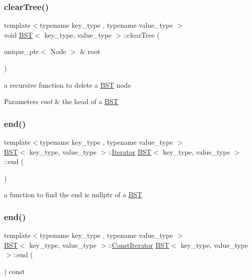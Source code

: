 \subsubsection{\texorpdfstring{clearTree()}{clearTree()}}
{\footnotesize\ttfamily template$<$typename key\+\_\+type , typename value\+\_\+type $>$ \\
void \mbox{\hyperlink{class_b_s_t}{B\+ST}}$<$ key\+\_\+type, value\+\_\+type $>$\+::clear\+Tree (\begin{DoxyParamCaption}\item[{unique\+\_\+ptr$<$ Node $>$ \&}]{root }\end{DoxyParamCaption})}

a recursive function to delete a \mbox{\hyperlink{class_b_s_t}{B\+ST}} node 
\begin{DoxyParams}{Parameters}
{\em root} & the head of a \mbox{\hyperlink{class_b_s_t}{B\+ST}} \\
\hline
\end{DoxyParams}
\mbox{\label{class_b_s_t_a758f78a965cb2816f0502ff78b2fb542}} 
\subsubsection{\texorpdfstring{end()}{end()}\hspace{0.1cm}{\footnotesize\ttfamily [1/2]}}
{\footnotesize\ttfamily template$<$typename key\+\_\+type , typename value\+\_\+type $>$ \\
\mbox{\hyperlink{class_b_s_t}{B\+ST}}$<$ key\+\_\+type, value\+\_\+type $>$\+::\mbox{\hyperlink{class_b_s_t_1_1_iterator}{Iterator}} \mbox{\hyperlink{class_b_s_t}{B\+ST}}$<$ key\+\_\+type, value\+\_\+type $>$\+::end (\begin{DoxyParamCaption}{ }\end{DoxyParamCaption})}

a function to find the end ie nullptr of a \mbox{\hyperlink{class_b_s_t}{B\+ST}} \mbox{\label{class_b_s_t_aacdfe4d003000ce143b43487fd509d61}} 
\subsubsection{\texorpdfstring{end()}{end()}\hspace{0.1cm}{\footnotesize\ttfamily [2/2]}}
{\footnotesize\ttfamily template$<$typename key\+\_\+type , typename value\+\_\+type $>$ \\
\mbox{\hyperlink{class_b_s_t}{B\+ST}}$<$ key\+\_\+type, value\+\_\+type $>$\+::\mbox{\hyperlink{class_b_s_t_1_1_const_iterator}{Const\+Iterator}} \mbox{\hyperlink{class_b_s_t}{B\+ST}}$<$ key\+\_\+type, value\+\_\+type $>$\+::end (\begin{DoxyParamCaption}{ }\end{DoxyParamCaption}) const}

